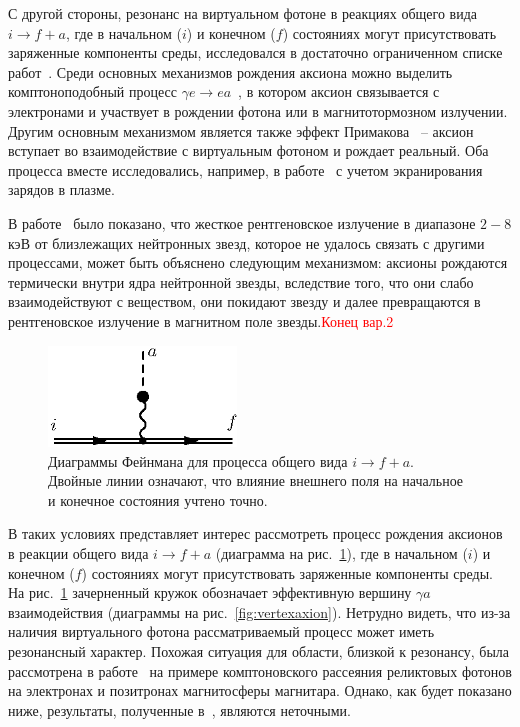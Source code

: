 С другой стороны, резонанс на виртуальном фотоне в реакциях общего вида $i \to f + a$, где в начальном ($i$) и конечном ($f$) состояниях могут присутствовать заряженные компоненты среды, исследовался в достаточно ограниченном списке работ~\cite{Skobelev:2000,Skobelev:2007,MikhRumShk:09}. Среди основных механизмов рождения аксиона можно выделить комптоноподобный процесс $\gamma e \to e a$~\cite{Skobelev:2000}, в котором аксион связывается с электронами и участвует в рождении фотона или в магнитотормозном излучении. Другим основным механизмом является также эффект Примакова~\cite{Primakoff:1951} -- аксион вступает во взаимодействие с виртуальным фотоном и рождает реальный. Оба процесса вместе исследовались, например, в работе~\cite{Raffelt:1996} с учетом экранирования зарядов в плазме.

В работе~\cite{Buschmann:2021} было показано, что жесткое рентгеновское излучение в диапазоне $2-8$ кэВ от близлежащих нейтронных звезд, которое не удалось связать с другими процессами, может быть объяснено следующим механизмом: аксионы рождаются термически внутри ядра нейтронной звезды, вследствие того, что они слабо взаимодействуют с веществом, они покидают звезду и далее превращаются в рентгеновское излучение в магнитном поле звезды.\textcolor{red}{Конец вар.2}

%
\begin{figure}
\centerline{\includegraphics[width=5cm]{fig5_1.eps}}
\caption{Диаграммы Фейнмана для процесса общего вида $i \to 
f+a$. Двойные линии означают, что влияние внешнего поля на начальное и 
конечное состояния учтено точно.}
\label{fig:Diagaxion}
\end{figure}


В таких условиях представляет интерес рассмотреть процесс рождения аксионов   в 
реакции общего вида $i \to f + a$ (диаграмма на рис.~\ref{fig:Diagaxion}), 
где в начальном ($i$) и конечном ($f$) состояниях могут присутствовать 
заряженные компоненты среды. 
На рис.~\ref{fig:Diagaxion} зачерненный
кружок обозначает эффективную вершину $\gamma a$ взаимодействия
(диаграммы на рис.~\ref{fig:vertexaxion}). Нетрудно видеть, что из-за наличия виртуального 
фотона рассматриваемый процесс может иметь резонансный характер. Похожая ситуация
для области, близкой к резонансу, была рассмотрена в работе~\cite{Skobelev:2007} 
на примере
комптоновского рассеяния реликтовых фотонов на электронах и позитронах магнитосферы
магнитара. Однако, как будет показано ниже,  результаты, полученные 
в~\cite{Skobelev:2007}, являются неточными. 

